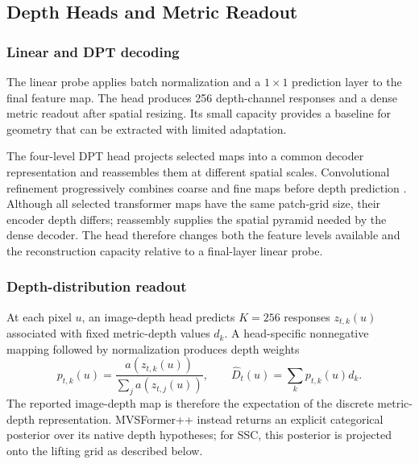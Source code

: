 \subsection{Depth Heads and Metric Readout}
\subsubsection{Linear and DPT decoding}
The linear probe applies batch normalization and a $1\times1$ prediction layer to the final feature map. The head produces 256 depth-channel responses and a dense metric readout after spatial resizing. Its small capacity provides a baseline for geometry that can be extracted with limited adaptation.

The four-level DPT head projects selected maps into a common decoder representation and reassembles them at different spatial scales. Convolutional refinement progressively combines coarse and fine maps before depth prediction \cite{ranftl2021dpt}. Although all selected transformer maps have the same patch-grid size, their encoder depth differs; reassembly supplies the spatial pyramid needed by the dense decoder. The head therefore changes both the feature levels available and the reconstruction capacity relative to a final-layer linear probe.

\subsubsection{Depth-distribution readout}
At each pixel $u$, an image-depth head predicts $K=256$ responses
$z_{t,k}(u)$ associated with fixed metric-depth values $d_k$. A
head-specific nonnegative mapping followed by normalization produces
depth weights
\begin{equation}
p_{t,k}(u)=
\frac{a(z_{t,k}(u))}
     {\sum_j a(z_{t,j}(u))},
\qquad
\hat D_t(u)=\sum_k p_{t,k}(u)d_k .
\label{eq:depth}
\end{equation}
The reported image-depth map is therefore the expectation of the
discrete metric-depth representation. MVSFormer++ instead
returns an explicit categorical posterior over its native depth
hypotheses; for SSC, this posterior is projected onto the lifting grid
as described below.

